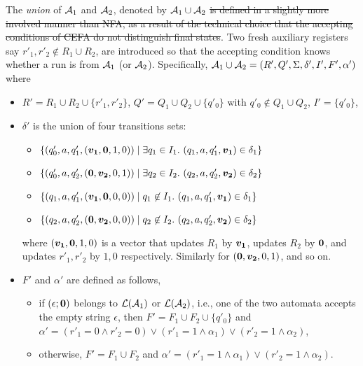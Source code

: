The \emph{union} of $\mathcal{A}_1$ and $\mathcal{A}_2$, denoted by $\mathcal{A}_1 \cup \mathcal{A}_2$ \sout{is defined in a slightly more involved manner than NFA, as a result of the technical choice that the accepting conditions of CEFA do not distinguish final states}. Two fresh auxiliary registers say $r'_1,r'_2 \not \in R_1 \cup R_2$, are introduced so that the accepting condition knows whether a run is from $\mathcal{A}_1$ (or $\mathcal{A}_2$). Specifically, $\mathcal{A}_1 \cup \mathcal{A}_2 = (R', Q', \Sigma, \delta', I', F', \alpha')$ where 
\begin{itemize}
\item $R' = R_1 \cup R_2 \cup \{r'_1, r'_2\}$, $Q' = Q_1 \cup Q_2 \cup \{q'_0\}$ with $q'_0 \not \in Q_1 \cup Q_2$, $I' = \{q'_0\}$, 
%
\item $\delta'$ is the union of four transitions sets:
\begin{itemize}
  \item $\{(q'_0, a, q'_1, (\myvec{v_1}, \myvec{0}, 1,0)) \mid \exists q_1 \in I_1.\ (q_1, a, q'_1, \myvec{v_1}) \in \delta_1\}$
  \item $\{(q'_0, a, q'_2, (\myvec{0}, \myvec{v_2}, 0, 1)) \mid \exists q_2 \in I_2.\ (q_2, a, q'_2, \myvec{v_2}) \in \delta_2\}$
  \item $\{(q_1, a, q'_1, (\myvec{v_1}, \myvec{0}, 0, 0)) \mid q_1\not\in I_1.\ (q_1, a, q'_1, \myvec{v_1}) \in \delta_1\}$
  \item $\{(q_2, a, q'_2, (\myvec{0}, \myvec{v_2}, 0, 0)) \mid q_2\not\in I_2.\ (q_2, a, q'_2, \myvec{v_2}) \in \delta_2\}$
\end{itemize}
 where $(\myvec{v_1}, \myvec{0}, 1,0)$ is a vector that updates $R_1$ by $\myvec{v_1}$, updates $R_2$ by $\myvec{0}$, and updates $r'_1,r'_2$ by $1,0$ respectively. Similarly for $(\myvec{0}, \myvec{v_2}, 0, 1)$, and so on.

\item $F'$ and $\alpha'$ are defined as follows, 
\begin{itemize}
\item if $(\epsilon; \myvec{0})$ belongs to $\mathcal{L}(\mathcal{A}_1)$ or $\mathcal{L}(\mathcal{A}_2)$, i.e., one of the two automata accepts the empty string $\epsilon$, then $F' = F_1 \cup F_2 \cup \{q'_0\}$ and $\alpha' = (r'_1 = 0 \wedge r'_2 = 0) \vee (r'_1=1 \wedge \alpha_1) \vee (r'_2=1 \wedge \alpha_2)$, 
%
%
\item otherwise, $F'=F_1 \cup F_2$ and $\alpha' = (r'_1=1 \wedge \alpha_1) \vee (r'_2=1 \wedge \alpha_2)$.
\end{itemize}
\end{itemize}
